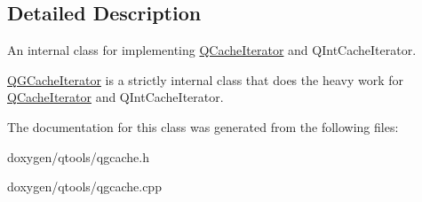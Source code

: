 \subsection{Detailed Description}
An internal class for implementing \mbox{\hyperlink{class_q_cache_iterator}{Q\+Cache\+Iterator}} and Q\+Int\+Cache\+Iterator. 

\mbox{\hyperlink{class_q_g_cache_iterator}{Q\+G\+Cache\+Iterator}} is a strictly internal class that does the heavy work for \mbox{\hyperlink{class_q_cache_iterator}{Q\+Cache\+Iterator}} and Q\+Int\+Cache\+Iterator. 

The documentation for this class was generated from the following files\+:\begin{DoxyCompactItemize}
\item 
doxygen/qtools/qgcache.\+h\item 
doxygen/qtools/qgcache.\+cpp\end{DoxyCompactItemize}
